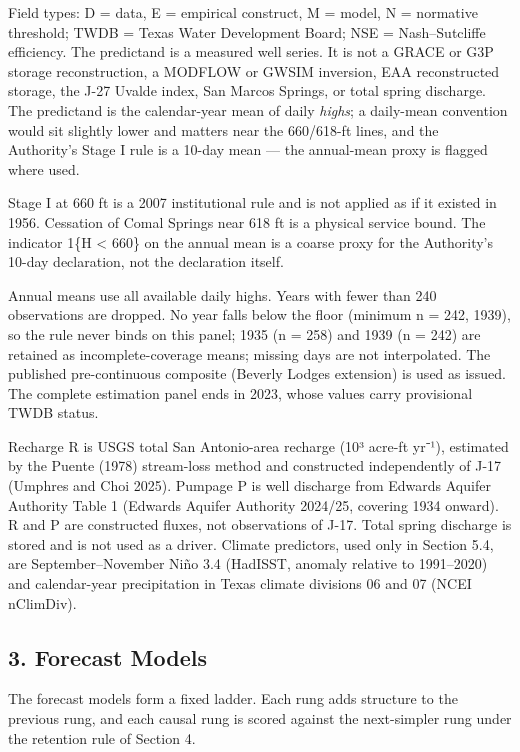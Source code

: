 \documentclass[11pt]{article}
\begin{document}
Field types: D = data, E = empirical construct, M = model, N = normative
threshold; TWDB = Texas Water Development Board; NSE = Nash--Sutcliffe
efficiency. The predictand is a measured well series. It is not a GRACE
or G3P storage reconstruction, a MODFLOW or GWSIM inversion, EAA
reconstructed storage, the J-27 Uvalde index, San Marcos Springs, or
total spring discharge. The predictand is the calendar-year mean of
daily \emph{highs}; a daily-mean convention would sit slightly lower and
matters near the 660/618-ft lines, and the Authority's Stage I rule is a
10-day mean --- the annual-mean proxy is flagged where used.

Stage I at 660 ft is a 2007 institutional rule and is not applied as if
it existed in 1956. Cessation of Comal Springs near 618 ft is a physical
service bound. The indicator 1\{H \textless{} 660\} on the annual mean
is a coarse proxy for the Authority's 10-day declaration, not the
declaration itself.

Annual means use all available daily highs. Years with fewer than 240
observations are dropped. No year falls below the floor (minimum n =
242, 1939), so the rule never binds on this panel; 1935 (n = 258) and
1939 (n = 242) are retained as incomplete-coverage means; missing days
are not interpolated. The published pre-continuous composite (Beverly
Lodges extension) is used as issued. The complete estimation panel ends
in 2023, whose values carry provisional TWDB status.

Recharge R is USGS total San Antonio-area recharge (10³ acre-ft yr⁻¹),
estimated by the Puente (1978) stream-loss method and constructed
independently of J-17 (Umphres and Choi 2025). Pumpage P is well
discharge from Edwards Aquifer Authority Table 1 (Edwards Aquifer
Authority 2024/25, covering 1934 onward). R and P are constructed
fluxes, not observations of J-17. Total spring discharge is stored and
is not used as a driver. Climate predictors, used only in Section 5.4,
are September--November Niño 3.4 (HadISST, anomaly relative to
1991--2020) and calendar-year precipitation in Texas climate divisions
06 and 07 (NCEI nClimDiv).

\subsection{3. Forecast Models}\label{forecast-models}

The forecast models form a fixed ladder. Each rung adds structure to the
previous rung, and each causal rung is scored against the next-simpler
rung under the retention rule of Section 4.
\end{document}
